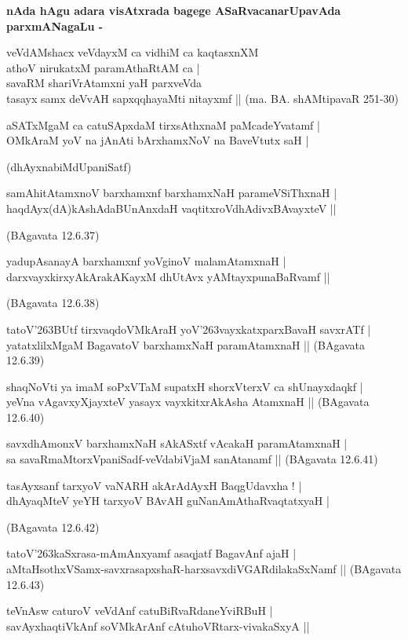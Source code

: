 {\bigskip
\noindent
{\large\bf nAda hAgu adara visAtxrada bagege ASaRvacanarUpavAda parxmANagaLu -}}
\begin{itemize}
{\bf
\item[1.] veVdAMshacx veVdayxM ca vidhiM ca kaqtasxnXM\\\label{144}
athoV nirukatxM paramAthaRtAM ca |\\
savaRM shariVrAtamxni yaH parxveVda\\
tasayx samx deVvAH sapxqqhayaMti nitayxmf ||
\hfill{(ma. BA. shAMtipavaR 251-30)}
\item[2.] aSATxMgaM ca catuSApxdaM tirxsAthxnaM paMcadeYvatamf |\\\label{144a}
OMkAraM yoV na jAnAti bArxhamxNoV na BaveVtutx saH |

\hfill{(dhAyxnabiMdUpaniSatf)}
\item[3.] samAhitAtamxnoV barxhamxnf barxhamxNaH parameVSiThxnaH |\\\label{144b}
haqdAyx(dA)kAshAdaBUnAnxdaH vaqtitxroVdhAdivxBAvayxteV ||

\hfill{(BAgavata 12.6.37)}}

{\bf
\item[4.] yadupAsanayA barxhamxnf yoVginoV malamAtamxnaH |\\
darxvayxkirxyAkArakAKayxM dhUtAvx yAMtayxpunaBaRvamf ||

\hfill{(BAgavata 12.6.38)}
\item[5.] tatoV\char'263BUtf tirxvaqdoVMkAraH yoV\char'263vayxkatxparxBavaH savxrATf |\\
yatatxlilxMgaM BagavatoV barxhamxNaH paramAtamxnaH ||
\hfill{(BAgavata 12.6.39)}
\item[6.] shaqNoVti ya imaM soPxVTaM supatxH shorxVterxV ca shUnayxdaqkf |\\
yeVna vAgavxyXjayxteV yasayx vayxkitxrAkAsha AtamxnaH ||
\hfill{(BAgavata 12.6.40)}
\item[7.] savxdhAmonxV barxhamxNaH sAkASxtf vAcakaH paramAtamxnaH |\\
sa savaRmaMtorxVpaniSadf-veVdabiVjaM sanAtanamf ||
\hfill{(BAgavata 12.6.41)}
\item[8.] tasAyxsanf tarxyoV vaNARH akArAdAyxH BaqgUdavxha ! |\\
dhAyaqMteV yeYH tarxyoV BAvAH guNanAmAthaRvaqtatxyaH |

\hfill{(BAgavata 12.6.42)}
\item[9.] tatoV\char'263kaSxrasa-mAmAnxyamf asaqjatf BagavAnf ajaH |\\
aMtaHsothxVSamx-savxrasapxshaR-harxsavxdiVGARdilakaSxNamf ||
\hfill{(BAgavata 12.6.43)}
\item[10.] teVnAsw caturoV veVdAnf catuBiRvaRdaneYviRBuH |\\
savAyxhaqtiVkAnf soVMkArAnf cAtuhoVRtarx-vivakaSxyA ||

}
\end{itemize}
